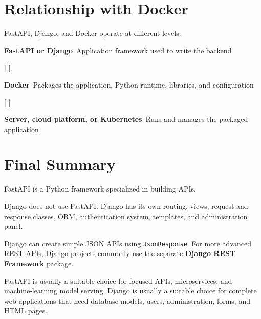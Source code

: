 \documentclass[a4paper]{article}
\begin{document}
    
    \section*{Relationship with Docker}
        
        FastAPI, Django, and Docker operate at different levels:
        
        \begin{tcolorbox}[
            colback=rowgray,
            colframe=headerblue,
            boxrule=0.7pt,
            arc=2pt,
            breakable
        ]
            \begin{center}
                \textbf{FastAPI or Django}\
                Application framework used to write the backend
            \end{center}
            
            [
            \Downarrow
            ]
            
            \begin{center}
                \textbf{Docker}\
                Packages the application, Python runtime, libraries, and configuration
            \end{center}
            
            [
            \Downarrow
            ]
            
            \begin{center}
                \textbf{Server, cloud platform, or Kubernetes}\
                Runs and manages the packaged application
            \end{center}
        \end{tcolorbox}
    
    
    \section*{Final Summary}
        
        \begin{tcolorbox}[
            colback=lightblue,
            colframe=headerblue,
            title=\textbf{Summary},
            fonttitle=\bfseries,
            breakable
        ]
            FastAPI is a Python framework specialized in building APIs.
            
            Django does not use FastAPI. Django has its own routing, views, request
            and response classes, ORM, authentication system, templates, and
            administration panel.
            
            Django can create simple JSON APIs using \texttt{JsonResponse}. For more
            advanced REST APIs, Django projects commonly use the separate
            \textbf{Django REST Framework} package.
            
            FastAPI is usually a suitable choice for focused APIs, microservices,
            and machine-learning model serving. Django is usually a suitable choice
            for complete web applications that need database models, users,
            administration, forms, and HTML pages.
        \end{tcolorbox}
        
%        
%        
\end{document}
